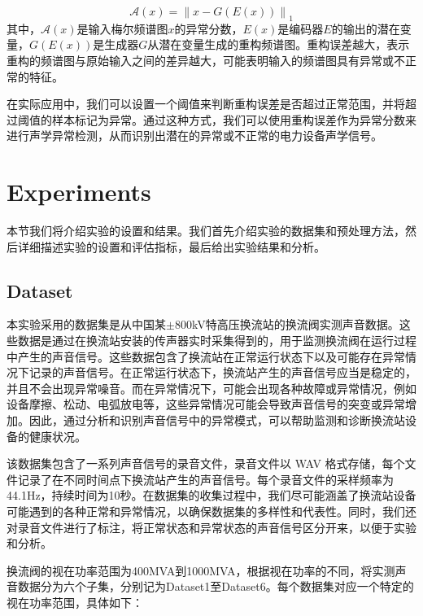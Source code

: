 \documentclass{article}
\begin{document}
\begin{equation}
\mathcal{A}(x)=\left\|x-G\left(E(x)\right)\right\|_1
\end{equation}
其中，$\mathcal{A}(x)$是输入梅尔频谱图$x$的异常分数，$E(x)$是编码器$E$的输出的潜在变量，$G(E(x))$是生成器$G$从潜在变量生成的重构频谱图。重构误差越大，表示重构的频谱图与原始输入之间的差异越大，可能表明输入的频谱图具有异常或不正常的特征。

在实际应用中，我们可以设置一个阈值来判断重构误差是否超过正常范围，并将超过阈值的样本标记为异常。通过这种方式，我们可以使用重构误差作为异常分数来进行声学异常检测，从而识别出潜在的异常或不正常的电力设备声学信号。

\section{Experiments}
本节我们将介绍实验的设置和结果。我们首先介绍实验的数据集和预处理方法，然后详细描述实验的设置和评估指标，最后给出实验结果和分析。

\subsection{Dataset}
本实验采用的数据集是从中国某\(\pm\)800kV特高压换流站的换流阀实测声音数据。这些数据是通过在换流站安装的传声器实时采集得到的，用于监测换流阀在运行过程中产生的声音信号。这些数据包含了换流站在正常运行状态下以及可能存在异常情况下记录的声音信号。在正常运行状态下，换流站产生的声音信号应当是稳定的，并且不会出现异常噪音。而在异常情况下，可能会出现各种故障或异常情况，例如设备摩擦、松动、电弧放电等，这些异常情况可能会导致声音信号的突变或异常增加。因此，通过分析和识别声音信号中的异常模式，可以帮助监测和诊断换流站设备的健康状况。

该数据集包含了一系列声音信号的录音文件，录音文件以 WAV 格式存储，每个文件记录了在不同时间点下换流站产生的声音信号。每个录音文件的采样频率为44.1Hz，持续时间为10秒。在数据集的收集过程中，我们尽可能涵盖了换流站设备可能遇到的各种正常和异常情况，以确保数据集的多样性和代表性。同时，我们还对录音文件进行了标注，将正常状态和异常状态的声音信号区分开来，以便于实验和分析。


换流阀的视在功率范围为400MVA到1000MVA，根据视在功率的不同，将实测声音数据分为六个子集，分别记为Dataset1至Dataset6。每个数据集对应一个特定的视在功率范围，具体如下：
\end{document}

